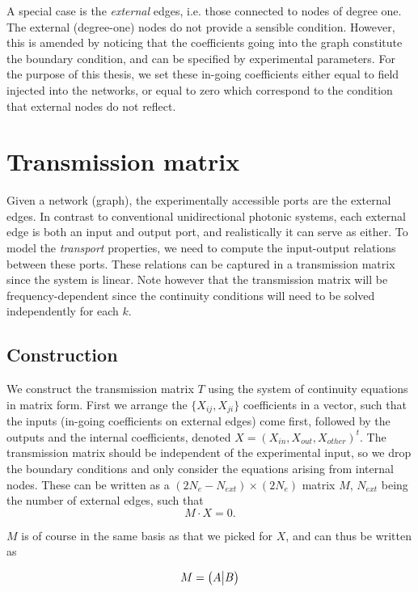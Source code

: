 A special case is the \textit{external} edges, i.e. those connected to nodes of degree one. The external (degree-one) nodes do not provide a sensible condition. However, this is amended by noticing that the coefficients going into the graph constitute the boundary condition, and can be specified by experimental parameters. For the purpose of this thesis, we set these in-going coefficients either equal to field injected into the networks, or equal to zero which correspond to the condition that external nodes do not reflect.

\section{Transmission matrix}
Given a network (graph), the experimentally accessible ports are the external edges. In contrast to conventional unidirectional photonic systems, each external edge is both an input and output port, and realistically it can serve as either. To model the \textit{transport} properties, we need to compute the input-output relations between these ports. These relations can be captured in a transmission matrix since the system is linear. Note however that the transmission matrix will be frequency-dependent since the continuity conditions will need to be solved independently for each $k$.

\subsection{Construction}
We construct the transmission matrix $T$ using the system of continuity equations in matrix form. First we arrange the $\{X_{ij},X_{ji}\}$ coefficients in a vector, such that the inputs (in-going coefficients on external edges) come first, followed by the outputs and the internal coefficients, denoted $X = (X_{in}, X_{out}, X_{other})^t$. The transmission matrix should be independent of the experimental input, so we drop the boundary conditions and only consider the equations arising from internal nodes. These can be written as a $(2N_e-N_{ext}) \times (2N_e)$ matrix $M$, $N_{ext}$ being the number of external edges, such that 
\begin{equation}
    \label{eq:Mopen}
    M\cdot X = 0.
\end{equation}

$M$ is of course in the same basis as that we picked for $X$, and can thus be written as 

\begin{equation}
\label{eq:M_AB}
M = \big{(}A \big{\rvert} B \big{)}
\end{equation}

